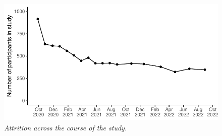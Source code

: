 \documentclass[
  man,floatsintext]{apa6}
\begin{document}
\newpage



\begin{figure}
\centering
\includegraphics{manuscript_files/figure-latex/plotAttrition-1.pdf}
\caption{\label{fig:plotAttrition}\emph{Attrition across the course of the study.}}
\end{figure}

\newpage
\end{document}
